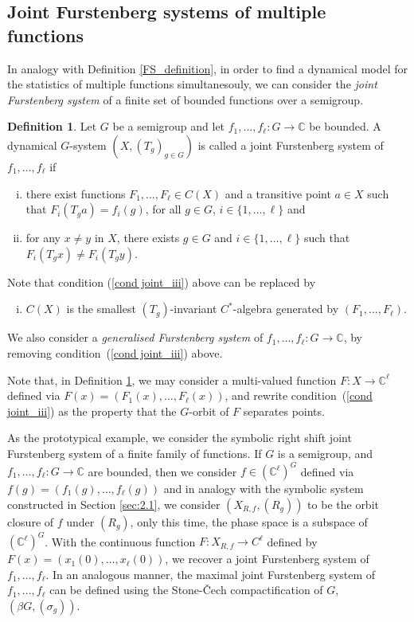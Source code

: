 \documentclass{amsart}
\numberwithin{equation}{section}
\theoremstyle{definition}
\newtheorem{definition}[lemma]{Definition}
\theoremstyle{plain}
\newcommand{\C}{{\mathbb C}}
\begin{document}
\subsection{Joint Furstenberg systems of multiple functions}\label{joint fs section}

In analogy with Definition \ref{FS_definition}, in 
order to find a dynamical 
model for the statistics of multiple functions simultanesouly, we can consider the 
\textit{joint Furstenberg system} of a finite set of bounded functions over a semigroup.

\begin{definition}\label{jointFS}
Let $G$ be a semigroup and let $f_1,\ldots,f_{\ell}: G\to \C$ be bounded. A 
dynamical $G$-system $(X,(T_g)_{g\in G})$ is called a joint Furstenberg 
system of $f_1,\ldots,f_{\ell}$ if 
\begin{enumerate}[(i)]
    \item \label{cond joint_i} there exist functions $F_1,\ldots,F_{\ell} \in C(X)$ and a transitive point $a\in X$ such that $F_i(T_ga)=f_i(g)$, for all $g\in G$, $i\in \{1,\ldots,\ell\}$ and
    \item \label{cond joint_iii} for any $x\neq y$ in $X$, there exists $g\in G$ and $i\in \{1,\ldots,\ell\}$ such that $F_i(T_gx)\neq F_i(T_gy)$.
\end{enumerate}
Note that condition (\ref{cond joint_iii}) above can be replaced by 
\begin{enumerate}[(iii)] 
    \item \label{cond joint_ii} $C(X)$ is the smallest $(T_g)$-invariant $C^{*}$-algebra generated by $(F_1,\ldots,F_{\ell})$.
\end{enumerate}
We also consider a \textit{generalised Furstenberg system} of 
$f_1,\ldots,f_{\ell}:G\to \C$, by removing condition~(\ref{cond joint_iii}) above. 
\end{definition}

Note that, in Definition \ref{jointFS}, we may consider 
a multi-valued function $F: X\to \C^{\ell}$ defined via 
$F(x)=(F_1(x),\ldots,F_{\ell}(x))$, and rewrite condition~(\ref{cond joint_iii}) as the 
property that the $G$-orbit of $F$ separates points.

As the prototypical example, we consider the symbolic right shift joint
Furstenberg system of a finite family of functions. If $G$ is a semigroup, and $f_1,\ldots,f_{\ell}:G\to \C$ are bounded, then we consider $f\in (\C^{\ell})^{G}$ defined via $f(g)=(f_1(g),\ldots,f_{\ell}(g))$ and in analogy with the symbolic system constructed in Section \ref{sec:2.1}, we consider $(X_{R,f},(R_g))$ to be the orbit closure of $f$ under $(R_g)$, only this time, the phase space is a subspace of $(\C^{\ell})^{G}$. With the continuous function $F: X_{R,f}\to C^{\ell}$ defined by $F(x)=(x_1(0),\ldots,x_{\ell}(0))$, we recover a joint Furstenberg system of $f_1,\ldots,f_{\ell}$. In an analogous manner, the maximal joint Furstenberg system of $f_1,\ldots,f_{\ell}$ can be defined using the Stone-\v{C}ech compactification of $G$, $(\beta G, (\sigma_g))$.
\end{document}
